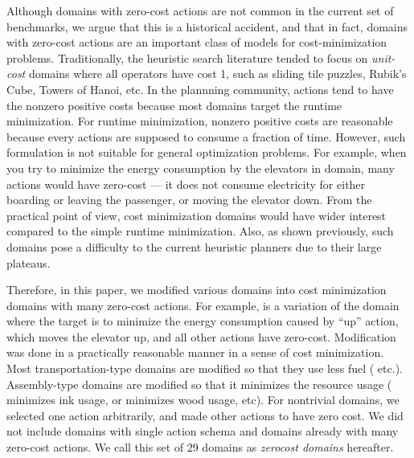 Although domains with zero-cost actions are not common in the current set of benchmarks, we argue that this is a historical accident, and that in fact, domains with zero-cost actions are an important class of models for cost-minimization problems.
% 
Traditionally, the heuristic search literature tended to focus on \emph{unit-cost} domains where all operators have cost 1, such as sliding tile puzzles, Rubik's Cube, Towers of Hanoi, etc.
% 
In the plannning community,
actions tend to have the nonzero positive costs
because most domains target the runtime minimization.
For runtime minimization,
nonzero positive costs are reasonable because
every actions are supposed to consume a fraction of time.
However, such formulation is not suitable for general optimization
problems.  For example, when you try to minimize the energy consumption
by the elevators in  domain, many actions would have zero-cost
--- it does not consume electricity for either boarding or leaving the
passenger, or moving the elevator down.
% 
From the practical point of
view, cost minimization domains would have wider interest compared to
the simple runtime minimization.
Also, as shown previously, such domains pose a
difficulty to the current heuristic planners due to their large plateaus.

Therefore, in this paper, we modified various domains
into cost minimization domains with many zero-cost actions.
For example,  is a variation of
the  domain where the target is to minimize
the energy consumption caused by ``up'' action, which moves the elevator
up, and all other actions have zero-cost.  Modification was done in a
practically reasonable manner in a sense of cost minimization. Most
transportation-type domains are modified so that they use less
fuel ( etc.). Assembly-type domains are modified so that it minimizes the
resource usage ( minimizes ink usage, or 
minimizes wood usage, etc). For nontrivial domains, we selected one action
arbitrarily, and made other actions to have zero cost. We did not
include domains with single action schema and domains already with many
zero-cost actions.
We call this set of 29 domains as \emph{zerocost domains} hereafter.


